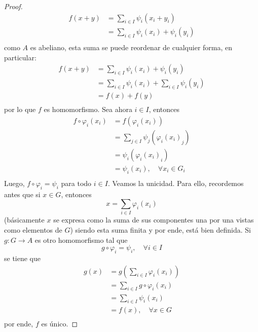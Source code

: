 \documentclass[12pt]{report}
\theoremstyle{largebreak}
\newcommand\cf[3]{\ensuremath{#1:#2\rightarrow#3}}
\begin{document}
\begin{proof}
        \begin{equation*}
            \begin{split}
                f(x+y)&=\sum_{ i\in I}\psi_i(x_i+y_i)\\
                &=\sum_{ i\in I}\psi_i(x_i)+\psi_i(y_i)\\
            \end{split}
        \end{equation*}
        como $A$ es abeliano, esta suma se puede reordenar de cualquier forma, en particular:
        \begin{equation*}
            \begin{split}
                f(x+y)&=\sum_{ i\in I}\psi_i(x_i)+\psi_i(y_i)\\
                &=\sum_{ i\in I}\psi_i(x_i)+\sum_{ i\in I}\psi_i(y_i)\\
                &=f(x)+f(y)\\
            \end{split}
        \end{equation*}
        por lo que $f$ es homomorfismo. Sea ahora $i\in I$, entonces
        \begin{equation*}
            \begin{split}
                f\circ\varphi_i(x_i)&=f(\varphi_i(x_i))\\
                &=\sum_{ j\in I}\psi_j({\varphi_i(x_i)}_j)\\
                &=\psi_i({\varphi_i(x_i)}_i)\\
                &=\psi_i(x_i),\quad\forall x_i\in G_i\\
            \end{split}
        \end{equation*}
        Luego, $f\circ\varphi_i=\psi_i$ para todo $i\in I$. Veamos la unicidad. Para ello, recordemos antes que si $x\in G$, entonces
        \begin{equation*}
            x=\sum_{ i\in I}\varphi_i(x_i)
        \end{equation*}
        (básicamente $x$ se expresa como la suma de sus componentes una por una vistas como elementos de $G$) siendo esta suma finita y por ende, está bien definida. Si $\cf{g}{G}{A}$ es otro homomorfismo tal que
        \begin{equation*}
            g\circ\varphi_i=\psi_i,\quad\forall i\in I
        \end{equation*}
        se tiene que
        \begin{equation*}
            \begin{split}
                g(x)&=g\left(\sum_{ i\in I}\varphi_i(x_i)\right)\\
                &=\sum_{ i\in I} g\circ\varphi_i(x_i)\\
                &=\sum_{ i\in I}\psi_i(x_i)\\
                &=f(x),\quad\forall x\in G\\
            \end{split}
        \end{equation*}
        por ende, $f$ es único.
    \end{proof}
\end{document}
